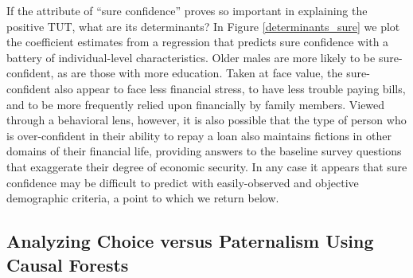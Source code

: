 \documentclass[oneside,11pt]{article}
\begin{document}

If the attribute of ``sure confidence'' proves so important in explaining the positive TUT, what are its determinants? In Figure \ref{determinants_sure} we plot the coefficient estimates from a regression that predicts sure confidence with a battery of individual-level characteristics.  Older males are more likely to be sure-confident, as are those with more education.  Taken at face value, the sure-confident also appear to face less financial stress, to have less trouble paying bills, and to be more frequently relied upon financially by family members.  Viewed through a behavioral lens, however, it is also possible that the type of person who is over-confident in their ability to repay a loan also maintains fictions in other domains of their financial life, providing answers to the baseline survey questions that exaggerate their degree of economic security. In any case it appears that sure confidence may be difficult to predict with easily-observed and objective demographic criteria, a point to which we return below.


\subsection{Analyzing Choice versus Paternalism Using Causal Forests} \label{sec:RF}
\end{document}
